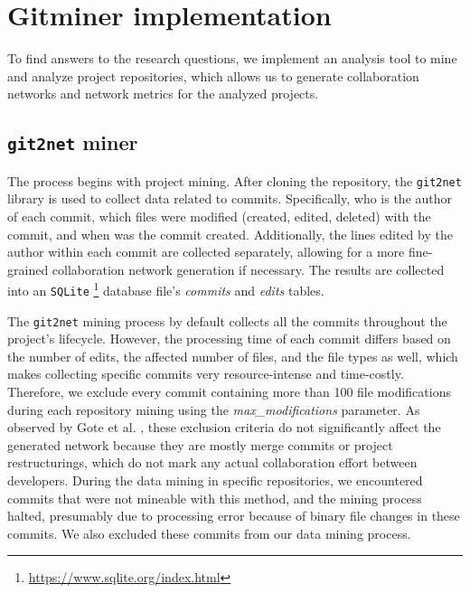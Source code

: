 

\section{Gitminer implementation}
To find answers to the research questions, we implement an analysis tool to mine and analyze project repositories, which allows us to generate collaboration networks and network metrics for the analyzed projects.

\subsection{\texttt{git2net} miner}
The process begins with project mining. After cloning the repository, the  \texttt{git2net} \cite{goteAnalysingTimeStampedCoEditing2019} library is used to collect data related to commits. Specifically, who is the author of each commit, which files were modified (created, edited, deleted) with the commit, and when was the commit created. Additionally, the lines edited by the author within each commit are collected separately, allowing for a more fine-grained collaboration network generation if necessary. The results are collected into an \texttt{SQLite} \footnote{\url{https://www.sqlite.org/index.html}} database file's \textit{commits} and \textit{edits} tables.

The \texttt{git2net} mining process by default collects all the commits throughout the project's lifecycle. However, the processing time of each commit differs based on the number of edits, the affected number of files, and the file types as well, which makes collecting specific commits very resource-intense and time-costly. Therefore, we exclude every commit containing more than 100 file modifications during each repository mining using the \textit{max\_modifications} parameter. As observed by Gote et al. \cite{goteAnalysingTimeStampedCoEditing2019}, these exclusion criteria do not significantly affect the generated network because they are mostly merge commits or project restructurings, which do not mark any actual collaboration effort between developers. During the data mining in specific repositories, we encountered commits that were not mineable with this method, and the mining process halted, presumably due to processing error because of binary file changes in these commits. We also excluded these commits from our data mining process.

